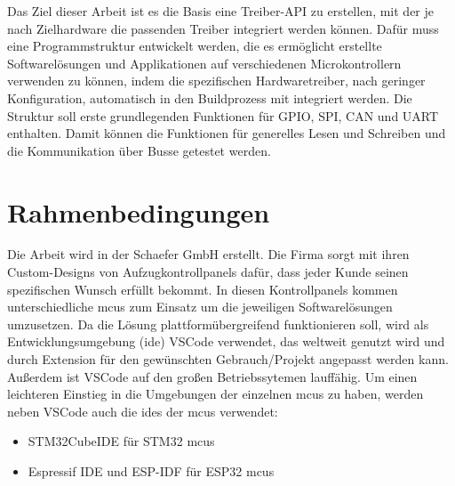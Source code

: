 Das Ziel dieser Arbeit ist es die Basis eine Treiber-API zu erstellen, mit der je nach Zielhardware die passenden Treiber integriert werden können.
Dafür muss eine Programmstruktur entwickelt werden, die es ermöglicht erstellte Softwarelösungen und Applikationen auf verschiedenen Microkontrollern verwenden zu können, indem die spezifischen Hardwaretreiber, nach geringer Konfiguration, automatisch in den Buildprozess mit integriert werden.
Die Struktur soll erste grundlegenden Funktionen für GPIO, SPI, CAN und UART enthalten. 
Damit können die Funktionen für generelles Lesen und Schreiben und die Kommunikation über Busse getestet werden.
\\
%
%
%




\section{Rahmenbedingungen}
Die Arbeit wird in der Schaefer GmbH erstellt. 
Die Firma sorgt mit ihren Custom-Designs von Aufzugkontrollpanels dafür, dass jeder Kunde seinen spezifischen Wunsch erfüllt bekommt.
In diesen Kontrollpanels kommen unterschiedliche \gls{mcu}s zum Einsatz um die jeweiligen Softwarelösungen umzusetzen.
Da die Lösung plattformübergreifend funktionieren soll, wird als Entwicklungsumgebung (\gls{ide}) VSCode verwendet, das weltweit genutzt wird und durch Extension für den gewünschten Gebrauch/Projekt angepasst werden kann. 
Außerdem ist VSCode auf den großen Betriebssytemen lauffähig.
Um einen leichteren Einstieg in die Umgebungen der einzelnen \gls{mcu}s zu haben, werden neben VSCode auch die \gls{ide}s der \gls{mcu}s verwendet:
\begin{itemize}
	\item STM32CubeIDE für STM32 \gls{mcu}s
	\item Espressif IDE und ESP-IDF für ESP32 \gls{mcu}s
\end{itemize}

